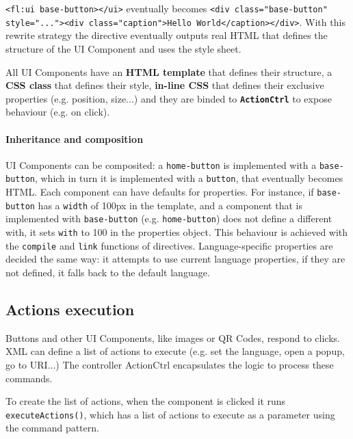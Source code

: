 \lstinline$<fl:ui base-button></ui>$ eventually becomes \lstinline$<div class="base-button" style="..."><div class="caption">Hello World</caption></div>$. 
With this rewrite strategy the directive eventually outputs real \ac{HTML} that defines the structure of the UI Component and uses the style sheet.

All UI Components have an  \textbf{\ac{HTML} template} that defines their structure, a \textbf{\ac{CSS} class} that defines their style, \textbf{in-line \ac{CSS}} that defines their exclusive properties (e.g. position, size...) and they are binded to \textbf{\texttt{ActionCtrl}} to expose behaviour (e.g. on click).
\FloatBarrier

\paragraph{Inheritance and composition} UI Components can be composited: a \texttt{home-button} is implemented with a \texttt{base-button}, which in turn it is implemented with a \texttt{button}, that eventually becomes \ac{HTML}.
Each component can have defaults for properties.
For instance, if \texttt{base-button} has a \texttt{width} of 100px in the template, and a component that is implemented with \texttt{base-button} (e.g. \texttt{home-button}) does not define a different with, it sets \texttt{with} to 100 in the properties object.
This behaviour is achieved with the \texttt{compile} and \texttt{link} functions of directives.
Language-specific properties are decided the same way: it attempts to use current language properties, if they are not defined, it falls back to the default language.

\subsection{Actions execution}
Buttons and other UI Components, like images or QR Codes, respond to clicks.
\ac{XML} can define a list of actions to execute (e.g. set the language, open a popup, go to \ac{URI}...)
The controller ActionCtrl encapsulates the logic to process these commands.





To create the list of actions, when the component is clicked it runs \lstinline$executeActions()$, which has a list of actions to execute as a parameter using the command pattern.

